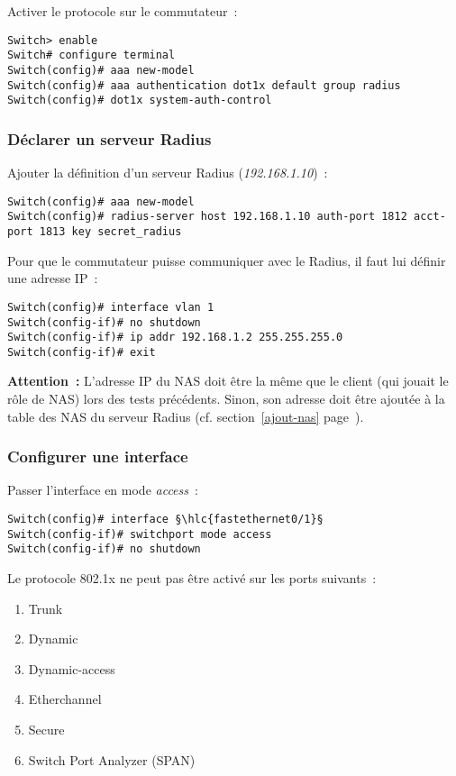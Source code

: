 Activer le protocole sur le commutateur~:

\begin{lstlisting}
Switch> enable
Switch# configure terminal
Switch(config)# aaa new-model
Switch(config)# aaa authentication dot1x default group radius
Switch(config)# dot1x system-auth-control
\end{lstlisting}

\subsubsection{Déclarer un serveur Radius}

Ajouter la définition d'un serveur Radius (\emph{192.168.1.10})~:

\begin{lstlisting}
Switch(config)# aaa new-model
Switch(config)# radius-server host 192.168.1.10 auth-port 1812 acct-port 1813 key secret_radius
\end{lstlisting}

Pour que le commutateur puisse communiquer avec le Radius, il faut lui définir une adresse IP~:

\begin{lstlisting}
Switch(config)# interface vlan 1
Switch(config-if)# no shutdown
Switch(config-if)# ip addr 192.168.1.2 255.255.255.0
Switch(config-if)# exit
\end{lstlisting}

\textbf{{\huge\Stopsign} Attention~:} L'adresse IP du NAS doit être la même que le client (qui jouait le rôle de NAS) lors des tests précédents. Sinon, son adresse doit être ajoutée à la table des NAS du serveur Radius (cf. section~\ref{ajout-nas} page~\pageref{ajout-nas}).

\subsubsection{Configurer une interface}

Passer l'interface en mode \emph{access}~:

\begin{lstlisting}
Switch(config)# interface §\hlc{fastethernet0/1}§
Switch(config-if)# switchport mode access
Switch(config-if)# no shutdown
\end{lstlisting}

Le protocole 802.1x ne peut pas être activé sur les ports suivants~:

\begin{enumerate}
\item Trunk
\item Dynamic
\item Dynamic-access
\item Etherchannel
\item Secure
\item Switch Port Analyzer (SPAN)
\end{enumerate}

